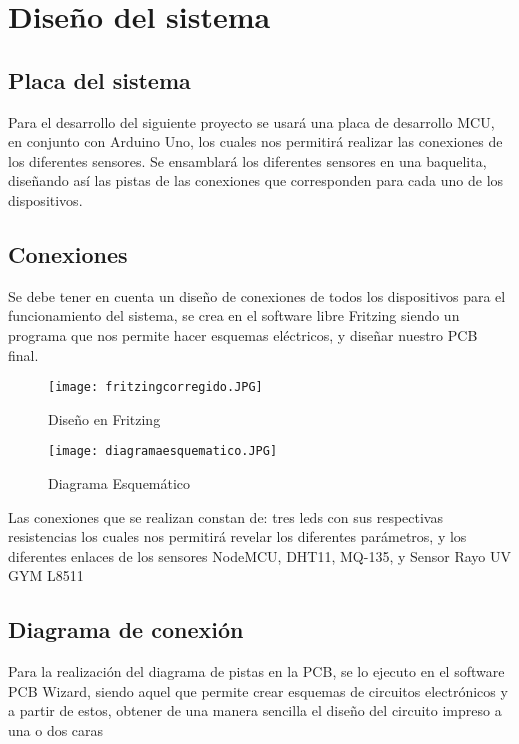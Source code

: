 \documentclass[10pt,a4paper]{article}
\begin{document}
\section{Diseño del sistema}
\subsection{Placa del sistema}

Para el desarrollo del siguiente proyecto se usará una placa de desarrollo MCU, en conjunto con Arduino Uno, los cuales nos permitirá realizar las conexiones de los diferentes sensores.
Se ensamblará los diferentes sensores en una baquelita, diseñando así las pistas de las conexiones que corresponden para cada uno de los dispositivos.

\subsection{Conexiones}

Se debe tener en cuenta un diseño de conexiones de todos los dispositivos para el funcionamiento del sistema, se crea en el software libre Fritzing siendo un programa que nos permite hacer esquemas eléctricos, y diseñar nuestro PCB final.

\begin{figure}[H]
\centering
 \texttt{[image: fritzingcorregido.JPG]} 
\caption{Diseño en Fritzing} 
\end{figure}

\begin{figure}[H]
\centering
 \texttt{[image: diagramaesquematico.JPG]} 
\caption{Diagrama Esquemático} 
\end{figure}

Las conexiones que se realizan constan de: tres leds con sus respectivas resistencias los cuales nos permitirá revelar los diferentes parámetros, y los diferentes enlaces de los sensores NodeMCU, DHT11, MQ-135, y Sensor Rayo UV GYM L8511

\subsection{Diagrama de conexión }

Para la realización del diagrama de pistas en la PCB, se lo ejecuto en el software PCB Wizard, siendo aquel que permite crear esquemas de circuitos electrónicos y a partir de estos, obtener de una manera sencilla el diseño del circuito impreso a una o dos caras
\end{document}
